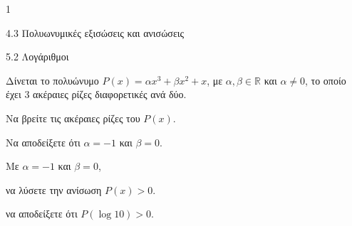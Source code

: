 \begin{ylh}{1}
\item 4.3 Πολυωνυμικές εξισώσεις και ανισώσεις
\item 5.2 Λογάριθμοι
\end{ylh}
Δίνεται το πολυώνυμο $P(x) = \alpha x^3 + \beta x^2 + x$, με $\alpha, \beta \in \mathbb{R}$ και $\alpha \neq 0$, το οποίο έχει 3 ακέραιες ρίζες διαφορετικές ανά δύο.
\begin{alist}
\item Να βρείτε τις ακέραιες ρίζες του $P(x)$.
\item Να αποδείξετε ότι $\alpha = -1$ και $\beta = 0$.
\item Με $\alpha = -1$ και $\beta = 0$,
\begin{rlist}
\item να λύσετε την ανίσωση $P(x) > 0$.
\item να αποδείξετε ότι $P(\log 10) > 0$.
\end{rlist}
\end{alist}

